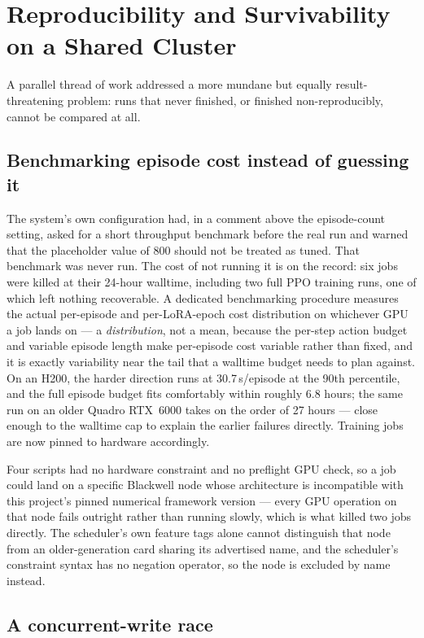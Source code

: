 \section{Reproducibility and Survivability on a Shared Cluster}
\label{sec:survivability}

A parallel thread of work addressed a more mundane but equally
result-threatening problem: runs that never finished, or finished
non-reproducibly, cannot be compared at all.

\subsection{Benchmarking episode cost instead of guessing it}

The system's own configuration had, in a comment above the episode-count
setting, asked for a short throughput benchmark before the real run and
warned that the placeholder value of 800 should not be treated as tuned.
That benchmark was never run. The cost of not running it is on the
record: six jobs were killed at their 24-hour walltime, including two
full PPO training runs, one of which left nothing recoverable. A
dedicated benchmarking procedure measures the actual per-episode and
per-LoRA-epoch cost distribution on whichever GPU a job lands on --- a
\emph{distribution}, not a mean, because the per-step action budget and
variable episode length make per-episode cost variable rather than fixed,
and it is exactly variability near the tail that a walltime budget needs
to plan against. On an H200, the harder \ntop{} direction runs at
30.7\,s/episode at the 90th percentile, and the full episode budget fits
comfortably within roughly 6.8 hours; the same run on an older Quadro
RTX~6000 takes on the order of 27 hours --- close enough to the walltime
cap to explain the earlier failures directly. Training jobs are now
pinned to hardware accordingly.

Four scripts had no hardware constraint and no preflight GPU check, so a
job could land on a specific Blackwell node whose architecture is
incompatible with this project's pinned numerical framework version ---
every GPU operation on that node fails outright rather than running
slowly, which is what killed two jobs directly. The scheduler's own
feature tags alone cannot distinguish that node from an older-generation
card sharing its advertised name, and the scheduler's constraint syntax
has no negation operator, so the node is excluded by name instead.

\subsection{A concurrent-write race}

